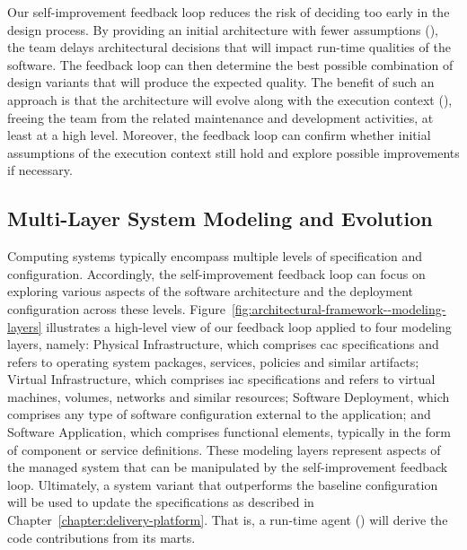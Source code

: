 Our self-improvement feedback loop reduces the risk of deciding too early in the design process. By providing an initial architecture with fewer assumptions (), the team delays architectural decisions that will impact run-time qualities of the software. The feedback loop can then determine the best possible combination of design variants that will produce the expected quality. The benefit of such an approach is that the architecture will evolve along with the execution context (), freeing the team from the related maintenance and development activities, at least at a high level. Moreover, the feedback loop can confirm whether initial assumptions of the execution context still hold and explore possible improvements if necessary.

\subsection{Multi-Layer System Modeling and Evolution}
\label{subsect:architectural-framework--system-modeling-and-evolution}

Computing systems typically encompass multiple levels of specification and configuration. Accordingly, the self-improvement feedback loop can focus on exploring various aspects of the software architecture and the deployment configuration across these levels. Figure~\ref{fig:architectural-framework--modeling-layers} illustrates a high-level view of our feedback loop applied to four modeling layers, namely: Physical Infrastructure, which comprises \gls{cac} specifications and refers to operating system packages, services, policies and similar artifacts; Virtual Infrastructure, which comprises \gls{iac} specifications and refers to virtual machines, volumes, networks and similar resources; Software Deployment, which comprises any type of software configuration external to the application; and Software Application, which comprises functional elements, typically in the form of component or service definitions. These modeling layers represent aspects of the managed system that can be manipulated by the self-improvement feedback loop. Ultimately, a system variant that outperforms the baseline configuration will be used to update the specifications as described in Chapter~\ref{chapter:delivery-platform}. That is, a run-time agent () will derive the code contributions from its \glspl{mart}.

